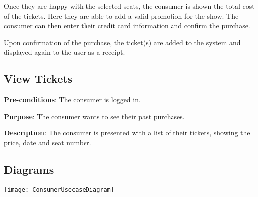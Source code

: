 Once they are happy with the selected seats, the consumer is
shown the total cost of the tickets. Here they are able to add a
valid promotion for the show. The consumer can then enter their
credit card information and confirm the purchase.

Upon confirmation of the purchase, the ticket(s) are added to the
system and displayed again to the user as a receipt.

\subsection{View Tickets}
\textbf{Pre-conditions}: The consumer is logged in.

\textbf{Purpose}: The consumer wants to see their past purchases.

\textbf{Description}: The consumer is presented with a list of
their tickets, showing the price, date and seat number.

\subsection{Diagrams}

\texttt{[image: ConsumerUsecaseDiagram]}
